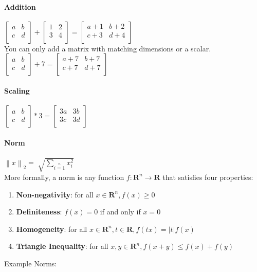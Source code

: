 \documentclass{article}
\newcommand{\norm}[1]{\left\lVert #1 \right\rVert} %
\begin{document}
\paragraph{Addition}
$\begin{bmatrix}
    a & b \\
    c & d \\
\end{bmatrix}
+
\begin{bmatrix}
    1 & 2 \\
    3 & 4 \\
\end{bmatrix}
=
\begin{bmatrix}
    a+1 & b+2 \\
    c+3 & d+4 \\
\end{bmatrix}$ \\
You can only add a matrix with matching dimensions or a scalar. \\
$\begin{bmatrix}
    a & b \\
    c & d \\
\end{bmatrix}
+
7
=
\begin{bmatrix}
    a+7 & b+7 \\
    c+7 & d+7 \\
\end{bmatrix}$
\paragraph{Scaling}
$\begin{bmatrix}
    a & b \\
    c & d \\
\end{bmatrix}
*
3
=
\begin{bmatrix}
    3a & 3b \\
    3c & 3d \\
\end{bmatrix}$
\paragraph{Norm} $\norm{x}_{2} = \sqrt[]{\sum\limits_{i=1}\limits^{n}{x_{i}^{2}}}$ \\
More formally, a norm is any function $f: \mathbf{R}^n \rightarrow \mathbf{R}$ that satisfies four properties:
\begin{enumerate}
  \item \textbf{Non-negativity}: for all $x\in \mathbf{R}^n, f(x) \geq 0$
  \item \textbf{Definiteness}: $f(x) = 0$ if and only if $x=0$
  \item \textbf{Homogeneity}: for all $x\in \mathbf{R}^n, t\in \mathbf{R}, f(tx) = \lvert t\rvert f(x)$
  \item \textbf{Triangle Inequality}: for all $x,y\in \mathbf{R}^n, f(x+y) \leq f(x) + f(y)$
\end{enumerate}  
Example Norms:
\end{document}
